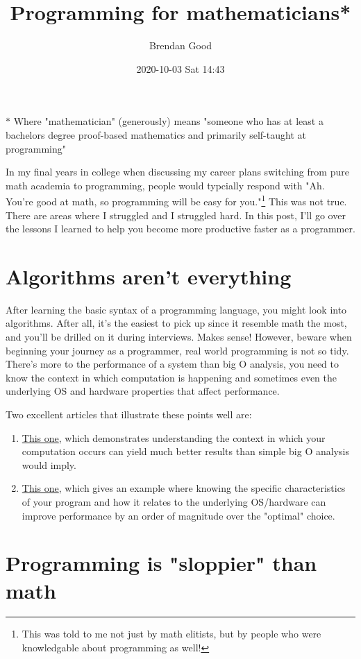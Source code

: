 \documentclass[11pt]{article}
\author{Brendan Good}
\date{2020-10-03 Sat 14:43}
\title{Programming for mathematicians*}
\begin{document}
\maketitle
\(\ast\) Where "mathematician" (generously) means "someone who has at least a bachelors degree proof-based mathematics and primarily self-taught at programming"

In my final years in college when discussing my career plans switching from pure math academia to programming, people would typcially respond with "Ah. You're good at math, so programming will be easy for you."\footnote{This was told to me not just by math elitists, but by people who were knowledgable about programming as well!} This was not true. There are areas where I struggled and I struggled hard. In this post, I'll go over the lessons I learned to help you become more productive faster as a programmer.

\section*{Algorithms aren't everything}
\label{sec:orgade0332}
After learning the basic syntax of a programming language, you might look into algorithms. After all, it's the easiest to pick up since it resemble math the most, and you'll be drilled on it during interviews. Makes sense! However, beware when beginning your journey as a programmer, real world programming is not so tidy. There's more to the performance of a system than big O analysis, you need to know the context in which computation is happening and sometimes even the underlying OS and hardware properties that affect performance.

Two excellent articles that illustrate these points well are:

\begin{enumerate}
\item \href{https://queue.acm.org/detail.cfm?id=2984631}{This one}, which demonstrates understanding the context in which your computation occurs can yield much better results than simple big O analysis would imply.
\item \href{https://queue.acm.org/detail.cfm?id=1814327}{This one}, which gives an example where knowing the specific characteristics of your program and how it relates to the underlying OS/hardware can improve performance by an order of magnitude over the "optimal" choice.
\end{enumerate}

\section*{Programming is "sloppier" than math}
\label{sec:orge04c25b}
\end{document}
